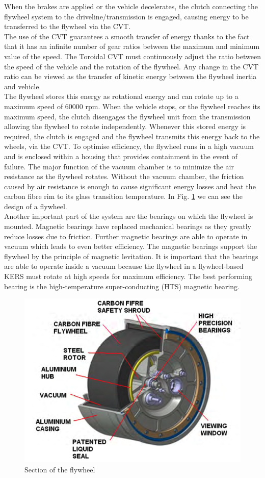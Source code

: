 \documentclass[11pt]{article}
\begin{document}
When the brakes are applied or the vehicle decelerates, the clutch connecting the flywheel system to the driveline/transmission is engaged, causing energy to be transferred to the flywheel via the CVT. \\
The use of the CVT guarantees a smooth transfer of energy thanks to the fact that it has an infinite number of gear ratios between the maximum and minimum value of the speed. The Toroidal CVT must continuously adjust the ratio between the speed of the vehicle and the rotation of the flywheel. Any change in the CVT ratio can be viewed as the transfer of kinetic energy between the flywheel inertia and vehicle.\\
The flywheel stores this energy as rotational energy and can rotate up to a maximum speed of $60000$ rpm. When the vehicle stops, or the flywheel reaches its maximum speed, the clutch disengages the flywheel unit from the transmission allowing the flywheel to rotate independently. Whenever this stored energy is required, the clutch is engaged and the flywheel transmits this energy back to the wheels, via the CVT. To optimise efficiency, the flywheel runs in a high vacuum and is enclosed within a housing that provides containment in the event of failure.
The major function of the vacuum chamber is to minimize the air resistance as the flywheel rotates. Without the vacuum chamber, the friction caused by air resistance is enough to cause significant energy losses and heat the carbon fibre rim to its glass transition temperature. In Fig. \ref{fig: Flywheel} we can see the design of a flywheel.\\
Another important part of the system are the bearings on which the flywheel is mounted. Magnetic bearings have replaced mechanical bearings as they greatly reduce losses due to friction. Further magnetic bearings are able to operate in vacuum which leads to even better efficiency. The magnetic bearings support the flywheel by the principle of magnetic levitation. It is important that the bearings are able to operate inside a vacuum because the flywheel in a flywheel-based KERS must rotate at high speeds for maximum efficiency. The best performing bearing is the high-temperature super-conducting (HTS) magnetic bearing.

\begin{figure}[H]
\centering
\includegraphics[width=.6\textwidth]{Images/State_of_the_art/Flywheel_Components.png}
\caption{Section of the flywheel}
\label{fig: Flywheel}
\end{figure}
\end{document}
